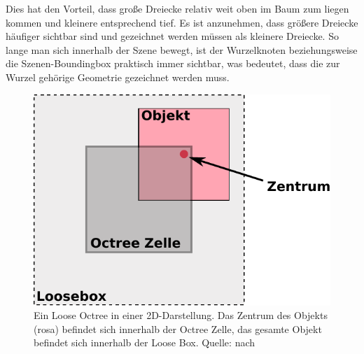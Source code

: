 Dies hat den Vorteil, dass große Dreiecke relativ weit oben im Baum zum liegen kommen und kleinere entsprechend tief. Es ist anzunehmen, dass größere Dreiecke häufiger sichtbar sind und gezeichnet werden müssen als kleinere Dreiecke. So lange man sich innerhalb der Szene bewegt, ist der Wurzelknoten beziehungsweise die Szenen-Boundingbox praktisch immer sichtbar, was bedeutet, dass die zur Wurzel gehörige Geometrie gezeichnet werden muss.
\begin{figure}
 \centering
  \includegraphics[scale=0.8]{images/looseoctree.pdf}
  \caption[Ein Loose Octree]{Ein Loose Octree in einer 2D-Darstellung. Das Zentrum des Objekts (rosa) befindet sich innerhalb der Octree Zelle, das gesamte Objekt befindet sich innerhalb der Loose Box. Quelle: nach}
 \label{fig:basics:looseoctree}
\end{figure}

